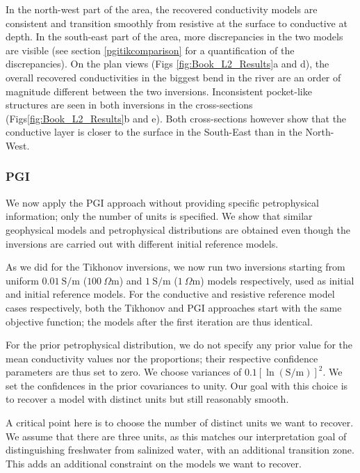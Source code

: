 \documentclass[extra]{gji} %
\begin{document}
In the north-west part of the area, the recovered conductivity models are consistent and transition smoothly from resistive at the surface to conductive at depth. In the south-east part of the area, more discrepancies in the two models are visible (see section \ref{pgitikcomparison} for a quantification of the discrepancies). On the plan views (Figs \ref{fig:Book_L2_Results}a and d), the overall recovered conductivities in the biggest bend in the river are an order of magnitude different between the two inversions. Inconsistent pocket-like structures are seen in both inversions in the cross-sections (Figs\ref{fig:Book_L2_Results}b and e). Both cross-sections however show that the conductive layer is closer to the surface in the South-East than in the North-West.

\subsubsection{PGI}

We now apply the PGI approach without providing specific petrophysical information; only the number of units is specified. We show that similar geophysical models and petrophysical distributions are obtained even though the inversions are carried out with different initial reference models.

As we did for the Tikhonov inversions, we now run two inversions starting from uniform $0.01~\text{S/m}$ ($100~\Omega \text{m}$) and $1~\text{S/m}$ ($1~\Omega \text{m}$) models respectively, used as initial and initial reference models. For the conductive and resistive reference model cases respectively, both the Tikhonov and PGI approaches start with the same objective function; the models after the first iteration are thus identical.

For the prior petrophysical distribution, we do not specify any prior value for the mean conductivity values nor the proportions; their respective confidence parameters are thus set to zero. We choose variances of $0.1 [\ln(\text{S/m})]^2$. We set the confidences in the prior covariances to unity. Our goal with this choice is to recover a model with distinct units but still reasonably smooth. %

A critical point here is to choose the number of distinct units we want to recover. We assume that there are three units, as this matches our interpretation goal of distinguishing freshwater from salinized water, with an additional transition zone. This adds an additional constraint on the models we want to recover.
\end{document}
